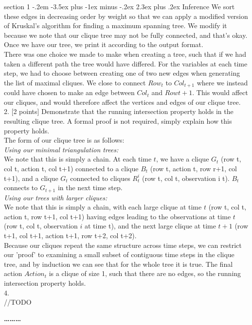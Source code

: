 \documentclass[12pt]{article}
\makeatletter
\newenvironment{problem}{\@startsection
       {section}
       {1}
       {-.2em}
       {-3.5ex plus -1ex minus -.2ex}
       {2.3ex plus .2ex}
       {\pagebreak[3]%
       \large\bf\noindent{Problem }
       }
       }
       {%
       \begin{center}\large\bf \ldots\ldots\ldots\end{center}}
\makeatother
\begin{document}
\begin{problem}{Inference}
We sort these edges in decreasing order by weight so that we can apply
a modified version of Kruskal's algorithm for finding a maximum spanning
tree.  We modify it because we note that our clique tree may not be 
fully connected, and that's okay.\\

Once we have our tree, we print it according to the output format.\\

There was one choice we made to make when creating a tree, such that if
we had taken a different path the tree would have differed.  For the 
variables at each time step, we had to choose between creating one of 
two new edges when generating the list of maximal cliques.  We close to
connect $Row_t$ to $Col_{t+1}$ where we instead could have chosen to make 
an edge between $Col_t$ and $Row{t+1}$.  This would affect our cliques, and
would therefore affect the vertices and edges of our clique tree.\\

2. [2 points] Demonstrate that the running intersection property holds 
in the resulting clique tree. A formal proof is not required, simply 
explain how this property holds.\\

\noindent The form of our clique tree is as follows:\\
\noindent \textit{Using our minimal triangulation trees:}\\
We note that this is simply a chain.  At each time $t$, we have a clique $G_t$ (row t, col t, action t, col t+1) connected to a clique $B_t$ (row t, action t, row r+1, col t+1), and a clique $G_t$ connected to cliques $R_{t}^{i}$ (row t, col t, observation i t).  $B_t$ connects to $G_{t+1}$ in the next time step.\\
\noindent \textit{Using our trees with larger cliques:}\\
We note that this is simply a chain, with each large clique at time $t$ (row t, col t, action t, row t+1, col t+1) having edges leading to the observations at time $t$ (row t, col t, observation $i$ at time t), and the next large clique at time $t+1$ (row t+1, col t+1, action t+1, row t+2, col t+2).\\

\noindent Because our cliques repeat the same structure across time steps, 
we can restrict our 'proof' to examining a small subset of contiguous
time steps in the clique tree, and by induction we can see that for the
whole tree it is true.  The final action $Action_t$ is a clique of size 1,
such that there are no edges, so the running intersection property holds. \\

4.\\

//TODO

\end{problem}{}
\end{document}
